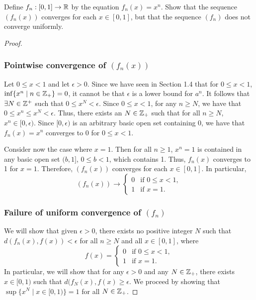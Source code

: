 \begin{exercise}[ID=2.21.6]
  Define $f_n: [0, 1] \rightarrow \mathbb{R}$ by the equation $f_n(x) = x^n$.
  Show that the sequence $(f_n(x))$ converges for each $x \in [0, 1]$, but that the sequence $(f_n)$ does not converge uniformly.
\end{exercise}
%
\begin{solution}
  \begin{proof}~
    \subsubsection*{Pointwise convergence of $(f_n(x))$}
    Let $0 \leq x < 1$ and let $\epsilon > 0$.
    Since we have seen in Section 1.4 that for $0 \leq x < 1$, $\inf\{x^n \mid n \in \mathbb{Z}_+\} = 0$, it cannot be that $\epsilon$ is a lower bound for $a^n$.
    It follows that $\exists N \in \mathbb{Z}^+$ such that $0 \leq x^N < \epsilon$.
    Since $0 \leq x < 1$, for any $n \geq N$, we have that $0 \leq x^n \leq x^N < \epsilon$.
    Thus, there exists an $N \in \mathbb{Z}_+$ such that for all $n \geq N$, $x^n \in [0, \epsilon)$.
    Since $[0, \epsilon)$ is an arbitrary basic open set containing 0, we have that $f_n(x) = x^n$ converges to 0 for $0 \leq x < 1$.

    Consider now the case where $x = 1$.
    Then for all $n \geq 1$, $x^n = 1$ is contained in any basic open set $(b, 1]$, $0 \leq b < 1$, which contains 1.
    Thus, $f_n(x)$ converges to 1 for $x = 1$.
    Therefore, $(f_n(x))$ converges for each $x \in [0, 1]$.
    In particular,
    \begin{equation*}
      (f_n(x)) \rightarrow
      \begin{cases}
        0 & \text{if } 0 \leq x < 1, \\
        1 & \text{if } x = 1.
      \end{cases}
    \end{equation*}

    \subsubsection*{Failure of uniform convergence of $(f_n)$}
    We will show that given $\epsilon > 0$, there exists no positive integer $N$ such that $d(f_n(x), f(x)) < \epsilon$ for all $n \geq N$ and all $x \in [0, 1]$, where
    \begin{equation*}
      f(x) =
      \begin{cases}
        0 & \text{if } 0 \leq x < 1, \\
        1 & \text{if } x = 1.
      \end{cases}
    \end{equation*}
    In particular, we will show that for any $\epsilon > 0$ and any $N \in \mathbb{Z}_+$, there exists $x \in [0, 1)$ such that $d(f_N(x), f(x) \geq \epsilon$.
    We proceed by showing that $\sup\{x^N \mid x \in [0, 1)\} = 1$ for all $N \in \mathbb{Z}_+$.


\end{proof}
\end{solution}
